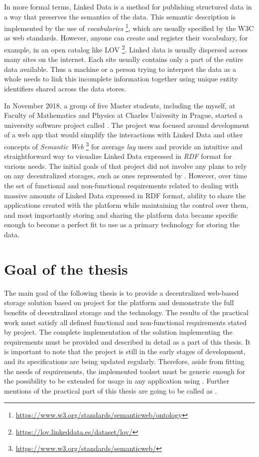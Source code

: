 In more formal terms, Linked Data is a method for publishing structured data in a way that preserves the semantics of the data. This semantic description is implemented by the use of \textit{vocabularies} \footnote{\url{https://www.w3.org/standards/semanticweb/ontology}}, which are usually specified by the \acrshort{W3C} as web standards. However, anyone can create and register their vocabulary, for example, in an open catalog like \acrshort{LOV} \footnote{\url{https://lov.linkeddata.es/dataset/lov/}}. Linked data is usually dispersed across many sites on the internet. Each site usually contains only a part of the entire data available. Thus a machine or a person trying to interpret the data as a whole needs to link this incomplete information together using unique entity identifiers shared across the data stores.

In November 2018, a group of five Master students, including the myself, at Faculty of Mathematics and Physics at Charles Univesity in Prague, started a university software project called \lpa{}. The project was focused around development of a web app that would simplify the interactions with Linked Data and other concepts of \textit{Semantic Web} \footnote{\url{https://www.w3.org/standards/semanticweb/}} for average \textit{lay} users and provide an intuitive and straightforward way to visualize Linked Data expressed in \textit{RDF} format for various needs. The initial goals of that project did not involve any plans to rely on any decentralized storages, such as ones represented by \solid{}. However, over time the set of functional and non-functional requirements related to dealing with massive amounts of Linked Data expressed in RDF format, ability to share the applications created with the platform while maintaining the control over them, and most importantly storing and sharing the \lpa{} platform data became specific enough to become a perfect fit to use \solid{} as a primary technology for storing the data. 
 
\section*{Goal of the thesis}
The main goal of the following thesis is to provide a decentralized web-based storage solution based on \solid{} project for the \lpa{} platform and demonstrate the full benefits of decentralized storage and the \solid{} technology. The results of the practical work must satisfy all defined functional and non-functional requirements stated by \lpa{} project. The complete implementation of the solution implementing the requirements must be provided and described in detail as a part of this thesis. It is important to note that the \solid{} project is still in the early stages of development, and its specifications are being updated regularly. Therefore, aside from fitting the needs of \lpa{} requirements, the implemented toolset must be generic enough for the possibility to be extended for usage in any application using \solid{}. Further mentions of the practical part of this thesis are going to be called as \lpas{}.

